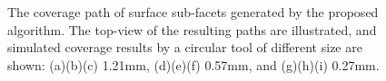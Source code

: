 \documentclass[lettersize,journal]{IEEEtran}
\begin{document}
\begin{figure}[t]
\caption{The coverage path of surface sub-facets generated by the proposed algorithm. The top-view of the resulting paths are illustrated, 
and simulated coverage results by a circular tool of different size are shown:  
(a)(b)(c) 1.21mm, (d)(e)(f) 0.57mm, and (g)(h)(i) 0.27mm.  }\label{fig:saddle_ours}
\end{figure}



\end{document}
